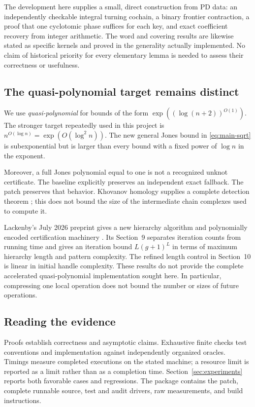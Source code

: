 The development here supplies a small, direct construction from PD data:
an independently checkable integral turning cochain, a binary frontier
contraction, a proof that one cyclotomic phase suffices for each key, and
exact coefficient recovery from integer arithmetic. The word and covering
results are likewise stated as specific kernels and proved in the
generality actually implemented. No claim of historical priority for every
elementary lemma is needed to assess their correctness or usefulness.

\subsection{The quasi-polynomial target remains distinct}

We use \emph{quasi-polynomial} for bounds of the form
$\exp((\log(n+2))^{O(1)})$. The stronger target repeatedly used in this
project is $n^{O(\log n)}=\exp(O(\log^2 n))$.
The new general Jones bound in \eqref{eq:main-sqrt} is subexponential but is
larger than every bound with a fixed power of $\log n$ in the exponent.

Moreover, a full Jones polynomial equal to one is not a recognized unknot
certificate. The baseline explicitly preserves an independent exact
fallback. The patch preserves that behavior. Khovanov homology supplies a
complete detection theorem \cite{kronheimer-mrowka}; this does not bound the
size of the intermediate chain complexes used to compute it.

Lackenby's July 2026 preprint gives a new hierarchy algorithm and
polynomially encoded certification machinery \cite{lackenby2026}. Its
Section~9 separates iteration counts from running time and gives an
iteration bound $L(g+1)^L$ in terms of maximum hierarchy length and pattern
complexity. The refined length control in Section~10 is linear in initial
handle complexity. These results do not provide the complete accelerated
quasi-polynomial implementation sought here. In particular, compressing one
local operation does not bound the number or sizes of future operations.

\subsection{Reading the evidence}

Proofs establish correctness and asymptotic claims. Exhaustive finite
checks test conventions and implementation against independently organized
oracles. Timings measure completed executions on the stated machine; a
resource limit is reported as a limit rather than as a completion time.
Section~\ref{sec:experiments} reports both favorable cases and regressions.
The package contains the patch, complete runnable source, test and audit
drivers, raw measurements, and build instructions.
